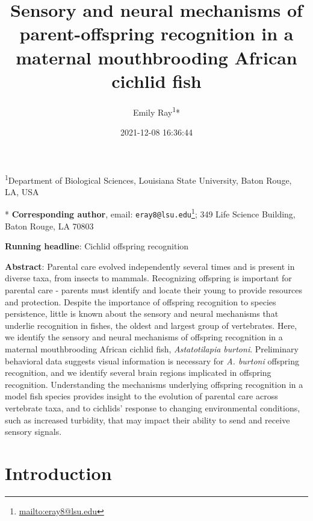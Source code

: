 \documentclass[
  12pt,
]{article}
\title{Sensory and neural mechanisms of parent-offspring recognition in a maternal mouthbrooding African cichlid fish}
\author{Emily Ray\textsuperscript{1}*}
\date{2021-12-08 16:36:44}
\DeclareRobustCommand{\href}[2]{#2\footnote{\url{#1}}}
\begin{document}
\maketitle

\footnotesize

\textsuperscript{1}Department of Biological Sciences, Louisiana State University, Baton Rouge, LA, USA

* \textbf{Corresponding author}, email: \href{mailto:eray8@lsu.edu}{\nolinkurl{eray8@lsu.edu}}; 349 Life Science Building, Baton Rouge, LA 70803

\normalsize

\textbf{Running headline}: Cichlid offspring recognition

\textbf{Abstract}: Parental care evolved independently several times and is present in diverse taxa, from insects to mammals. Recognizing offspring is important for parental care - parents must identify and locate their young to provide resources and protection. Despite the importance of offspring recognition to species persistence, little is known about the sensory and neural mechanisms that underlie recognition in fishes, the oldest and largest group of vertebrates. Here, we identify the sensory and neural mechanisms of offspring recognition in a maternal mouthbrooding African cichlid fish, \emph{Astatotilapia burtoni}. Preliminary behavioral data suggests visual information is necessary for \emph{A. burtoni} offspring recognition, and we identify several brain regions implicated in offspring recognition. Understanding the mechanisms underlying offspring recognition in a model fish species provides insight to the evolution of parental care across vertebrate taxa, and to cichlids' response to changing environmental conditions, such as increased turbidity, that may impact their ability to send and receive sensory signals.

\clearpage

\hypertarget{introduction}{%
\section{Introduction}\label{introduction}}
\end{document}
